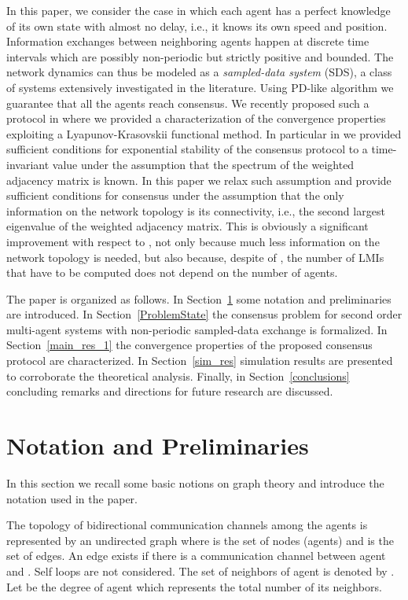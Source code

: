 \documentclass[conference]{IEEEtran}
\begin{document}
In this paper, we consider the case in which each agent has a perfect knowledge of its own state with almost no delay, i.e., it knows its own speed and position. Information exchanges between neighboring agents happen at discrete time intervals which are possibly non-periodic but strictly positive and bounded. The network dynamics can thus be modeled as a \emph{sampled-data system} (SDS), a class of systems extensively investigated in the literature. Using PD-like algorithm we guarantee that all the agents reach consensus. We recently proposed such a protocol in \cite{ETFA2014} where we provided a characterization of the convergence properties exploiting a Lyapunov-Krasovskii functional method. In particular in \cite{ETFA2014} we provided sufficient conditions for exponential stability of the consensus protocol to a time-invariant value under the assumption that the spectrum of the weighted adjacency matrix is known. In this paper we relax such assumption and provide sufficient conditions for consensus under the assumption that the only information on the network topology is its connectivity, i.e., the second largest eigenvalue of the weighted adjacency matrix. This is obviously a significant improvement with respect to \cite{ETFA2014}, not only because much less information on the network topology is needed, but also because, despite of \cite{ETFA2014}, the number of LMIs that have to be computed does not depend on the number of agents.

The paper is organized as follows. In Section~\ref{section:Prob_for} some notation and preliminaries are introduced. In Section~\ref{ProblemState} the consensus problem for second order multi-agent systems with non-periodic sampled-data exchange is formalized. In Section~\ref{main_res_1} the convergence properties of the proposed consensus protocol are characterized. In Section~\ref{sim_res} simulation results are presented to corroborate the theoretical analysis. Finally, in Section~\ref{conclusions} concluding remarks and directions for future research are discussed.


\section{Notation and Preliminaries}\label{section:Prob_for}

In this section we recall some basic notions on graph theory and introduce the notation used in the paper.

The topology of bidirectional communication channels
among the agents is represented by an undirected graph  where  is the set of nodes (agents) and  is the set of edges. An edge  exists if there is a
communication channel between agent  and . Self loops
 are not considered. The set of neighbors of agent 
is denoted by . Let
 be the degree of agent  which represents the total
number of its neighbors.
\end{document}
